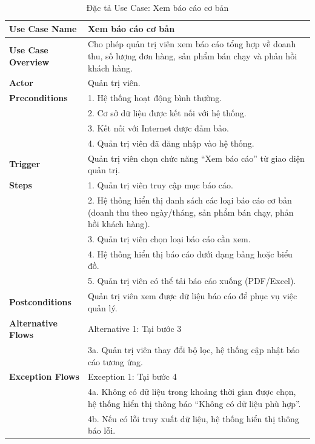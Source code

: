 {\begin{longtable}{|>{\bfseries}p{4cm}|p{11.5cm}|}
\caption{Đặc tả Use Case: Xem báo cáo cơ bản}
\label{tab:uc-admin-basic-reports} \\
\hline
\textbf{Use Case Name} & Xem báo cáo cơ bản \\
\hline
\textbf{Use Case Overview} & Cho phép quản trị viên xem báo cáo tổng hợp về doanh thu, số lượng đơn hàng, sản phẩm bán chạy và phản hồi khách hàng. \\
\hline
\textbf{Actor} & Quản trị viên. \\
\hline
\textbf{Preconditions} & 1. Hệ thống hoạt động bình thường. \\
& 2. Cơ sở dữ liệu được kết nối với hệ thống. \\
& 3. Kết nối với Internet được đảm bảo. \\
& 4. Quản trị viên đã đăng nhập vào hệ thống. \\
\hline
\textbf{Trigger} & Quản trị viên chọn chức năng “Xem báo cáo” từ giao diện quản trị. \\
\hline
\textbf{Steps} & 1. Quản trị viên truy cập mục báo cáo. \\
& 2. Hệ thống hiển thị danh sách các loại báo cáo cơ bản (doanh thu theo ngày/tháng, sản phẩm bán chạy, phản hồi khách hàng). \\
& 3. Quản trị viên chọn loại báo cáo cần xem. \\
& 4. Hệ thống hiển thị báo cáo dưới dạng bảng hoặc biểu đồ. \\
& 5. Quản trị viên có thể tải báo cáo xuống (PDF/Excel). \\
\hline
\textbf{Postconditions} & Quản trị viên xem được dữ liệu báo cáo để phục vụ việc quản lý. \\
\hline
\textbf{Alternative Flows} & Alternative 1: Tại bước 3 \\
& 3a. Quản trị viên thay đổi bộ lọc, hệ thống cập nhật báo cáo tương ứng. \\
\hline
\textbf{Exception Flows} & Exception 1: Tại bước 4 \\
& 4a. Không có dữ liệu trong khoảng thời gian được chọn, hệ thống hiển thị thông báo “Không có dữ liệu phù hợp”. \\
& 4b. Nếu có lỗi truy xuất dữ liệu, hệ thống hiển thị thông báo lỗi. \\
\hline
\end{longtable}

\setlength{\extrarowheight}{0pt} %

}